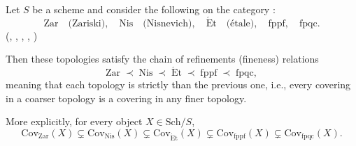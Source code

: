 \begin{theorem} \label{theorem:hierarchy_of_common_grothendieck_topologies_on_Sch_S}
    Let $S$ be a scheme and consider the following  on the category :
    \[
    \mathrm{Zar} \quad \text{(Zariski)}, \quad \mathrm{Nis} \quad \text{(Nisnevich)}, \quad \mathrm{\acute{E}t} \quad \text{(étale)}, \quad \mathrm{fppf}, \quad \mathrm{fpqc}.
    \]
    (, , , , )

    Then these topologies satisfy the chain of refinements (fineness) relations
    \[
    \mathrm{Zar} \; \prec \; \mathrm{Nis} \; \prec \; \mathrm{\acute{E}t} \; \prec \; \mathrm{fppf} \; \prec \; \mathrm{fpqc},
    \]
    meaning that each topology is strictly  than the previous one, i.e., every covering in a coarser topology is a covering in any finer topology.

    More explicitly, for every object $X \in \mathrm{Sch}/S$,
    $$
    \mathrm{Cov}_{\mathrm{Zar}}(X) \subsetneq \mathrm{Cov}_{\mathrm{Nis}}(X) \subsetneq \mathrm{Cov}_{\mathrm{\acute{E}t}}(X) \subsetneq \mathrm{Cov}_{\mathrm{fppf}}(X) \subsetneq \mathrm{Cov}_{\mathrm{fpqc}}(X).
    $$
\end{theorem}
